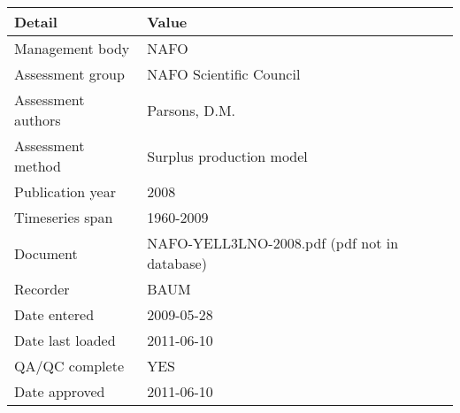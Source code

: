 \begin{table}[htb]
\centering
\begin{tabular}{ll}
\toprule
Detail & Value \\
\midrule
Management body    & NAFO                                         \\
Assessment group   & NAFO Scientific Council                      \\
Assessment authors & Parsons, D.M.                                \\
Assessment method  & Surplus production model                     \\
Publication year   & 2008                                         \\
Timeseries span    & 1960-2009                                    \\
Document           & NAFO-YELL3LNO-2008.pdf (pdf not in database) \\
Recorder           & BAUM                                         \\
Date entered       & 2009-05-28                                   \\
Date last loaded   & 2011-06-10                                   \\
QA/QC complete     & YES                                          \\
Date approved      & 2011-06-10                                   \\
\bottomrule
\end{tabular}
\label{tab:assessdet}
\end{table}
